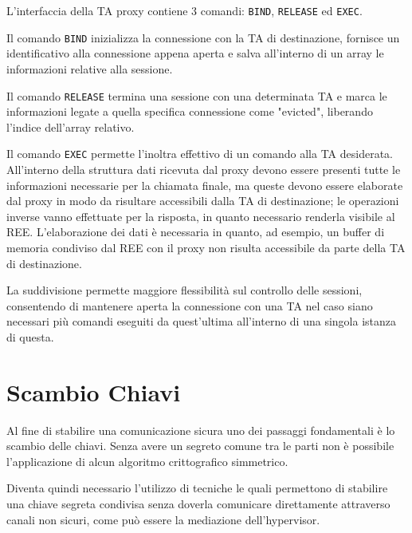 \documentclass[12pt,italian]{report}
\begin{document}
	\bigbreak
	
	L'interfaccia della TA proxy contiene 3 comandi: \texttt{BIND}, \texttt{RELEASE} ed \texttt{EXEC}.
	
	Il comando \texttt{BIND} inizializza la connessione con la TA di destinazione, fornisce un identificativo alla connessione appena aperta e salva all'interno di un array le informazioni relative alla sessione.
	
	Il comando \texttt{RELEASE} termina una sessione con una determinata TA e marca le informazioni legate a quella specifica connessione come "evicted", liberando l'indice dell'array relativo.  
	
	Il comando \texttt{EXEC} permette l'inoltra effettivo di un comando alla TA desiderata. All'interno della struttura dati ricevuta dal proxy devono essere presenti tutte le informazioni necessarie per la chiamata finale, ma queste devono essere elaborate dal proxy in modo da risultare accessibili dalla TA di destinazione; le operazioni inverse vanno effettuate per la risposta, in quanto necessario renderla visibile al REE. L'elaborazione dei dati è necessaria in quanto, ad esempio, un buffer di memoria condiviso dal REE con il proxy non risulta accessibile da parte della TA di destinazione. 
	
	La suddivisione permette maggiore flessibilità sul controllo delle sessioni, consentendo di mantenere aperta la connessione con una TA nel caso siano necessari più comandi eseguiti da quest'ultima all'interno di una singola istanza di questa.
	
	
	
	\newpage
	
	\section{Scambio Chiavi}
	\label{sec:scambio_chiavi}
	Al fine di stabilire una comunicazione sicura uno dei passaggi fondamentali è lo scambio delle chiavi. Senza avere un segreto comune tra le parti non è possibile l'applicazione di alcun algoritmo crittografico simmetrico.
	
	Diventa quindi necessario l'utilizzo di tecniche le quali permettono di stabilire una chiave segreta condivisa senza doverla comunicare direttamente attraverso canali non sicuri, come può essere la mediazione dell'hypervisor.
	
\end{document}
